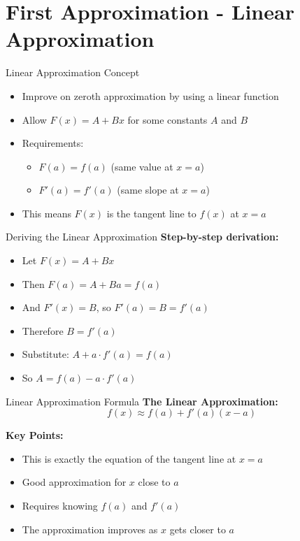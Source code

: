\documentclass[aspectratio=169]{beamer}
\begin{document}
\section{First Approximation - Linear Approximation}

\begin{frame}{Linear Approximation Concept}
\begin{itemize}
    \item Improve on zeroth approximation by using a linear function
    \item Allow $F(x) = A + Bx$ for some constants $A$ and $B$
    \item Requirements:
    \begin{itemize}
        \item $F(a) = f(a)$ (same value at $x = a$)
        \item $F'(a) = f'(a)$ (same slope at $x = a$)
    \end{itemize}
    \item This means $F(x)$ is the tangent line to $f(x)$ at $x = a$
\end{itemize}
\end{frame}

\begin{frame}{Deriving the Linear Approximation}
\textbf{Step-by-step derivation:}
\begin{itemize}
    \item Let $F(x) = A + Bx$
    \item Then $F(a) = A + Ba = f(a)$
    \item And $F'(x) = B$, so $F'(a) = B = f'(a)$
    \item Therefore $B = f'(a)$
    \item Substitute: $A + a \cdot f'(a) = f(a)$
    \item So $A = f(a) - a \cdot f'(a)$
\end{itemize}
\end{frame}

\begin{frame}{Linear Approximation Formula}
\textbf{The Linear Approximation:}
\[f(x) \approx f(a) + f'(a)(x - a)\]

\textbf{Key Points:}
\begin{itemize}
    \item This is exactly the equation of the tangent line at $x = a$
    \item Good approximation for $x$ close to $a$
    \item Requires knowing $f(a)$ and $f'(a)$
    \item The approximation improves as $x$ gets closer to $a$
\end{itemize}
\end{frame}
\end{document}
